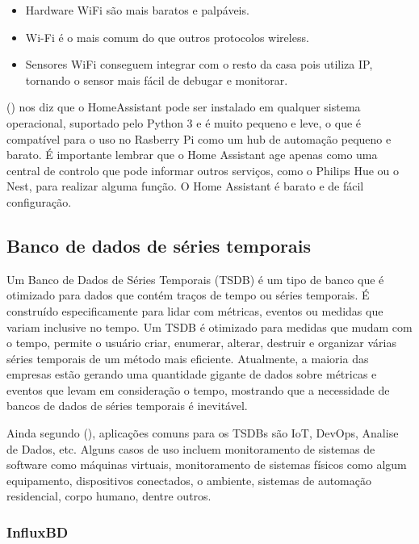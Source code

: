 \begin{itemize}
	\item Hardware WiFi são mais baratos e palpáveis.
	\item Wi-Fi é o mais comum do que outros protocolos wireless.
	\item Sensores WiFi conseguem integrar com o resto da casa pois utiliza IP, tornando o sensor mais fácil de debugar e monitorar.
\end{itemize}

\citeauthor{AlmeidaCosta} (\citeyear{AlmeidaCosta}) nos diz que o HomeAssistant pode ser instalado em qualquer sistema operacional, suportado pelo Python 3 e é muito pequeno e leve, o que é compatível para o uso no Rasberry Pi como um hub de automação pequeno e barato. É importante lembrar que o Home Assistant age apenas como uma central de controlo que pode informar outros serviços, como o Philips Hue ou o Nest, para realizar alguma função. O Home Assistant é barato e de fácil configuração.

\subsection{Banco de dados de séries temporais}

Um Banco de Dados de Séries Temporais (TSDB) é um tipo de banco que é otimizado para dados que contém traços de tempo ou séries temporais. É construído especificamente para lidar com métricas, eventos ou medidas que variam inclusive no tempo. Um TSDB é otimizado para medidas que mudam com o tempo, permite o usuário criar, enumerar, alterar, destruir e organizar várias séries temporais de um método mais eficiente. Atualmente, a maioria das empresas estão gerando uma quantidade gigante de dados sobre métricas e eventos que levam em consideração o tempo, mostrando que a necessidade de bancos de dados de séries temporais é inevitável.\cite{Noor2017}

Ainda segundo \citeauthor{Noor2017} (\citeyear{Noor2017}), aplicações comuns para os TSDBs são IoT, DevOps, Analise de Dados, etc. Alguns casos de uso incluem monitoramento de sistemas de software como máquinas virtuais, monitoramento de sistemas físicos como algum equipamento, dispositivos conectados, o ambiente, sistemas de automação residencial, corpo humano, dentre outros.

\subsubsection{InfluxBD}

